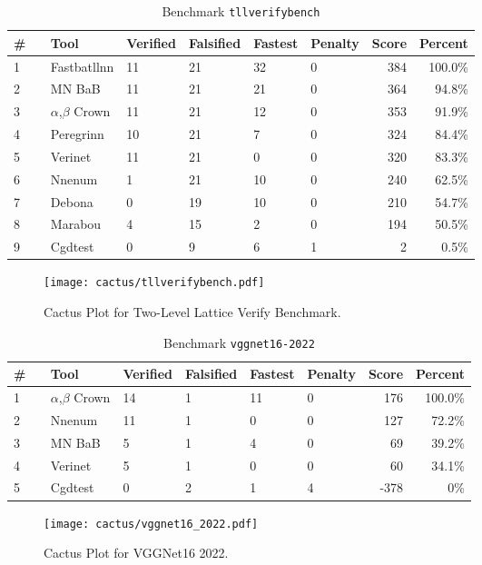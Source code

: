 
\begin{table}[h]
\begin{center}
\caption{Benchmark \texttt{tllverifybench}} \label{tab:cat_{cat}}
{\setlength{\tabcolsep}{2pt}
\begin{tabular}[h]{@{}llllllrr@{}}
\toprule
\textbf{\# ~} & \textbf{Tool} & \textbf{Verified} & \textbf{Falsified} & \textbf{Fastest} & \textbf{Penalty} & \textbf{Score} & \textbf{Percent}\\
\midrule
1 & Fastbatllnn & 11 & 21 & 32 & 0 & 384 & 100.0\% \\
2 & MN BaB & 11 & 21 & 21 & 0 & 364 & 94.8\% \\
3 & $\alpha$,$\beta$ Crown & 11 & 21 & 12 & 0 & 353 & 91.9\% \\
4 & Peregrinn & 10 & 21 & 7 & 0 & 324 & 84.4\% \\
5 & Verinet & 11 & 21 & 0 & 0 & 320 & 83.3\% \\
6 & Nnenum & 1 & 21 & 10 & 0 & 240 & 62.5\% \\
7 & Debona & 0 & 19 & 10 & 0 & 210 & 54.7\% \\
8 & Marabou & 4 & 15 & 2 & 0 & 194 & 50.5\% \\
9 & Cgdtest & 0 & 9 & 6 & 1 & 2 & 0.5\% \\
\bottomrule
\end{tabular}
}
\end{center}
\end{table}



\begin{figure}[h]
\centerline{\texttt{[image: cactus/tllverifybench.pdf]}}
\caption{Cactus Plot for Two-Level Lattice Verify Benchmark.}
\label{fig:quantPic}
\end{figure}



\begin{table}[h]
\begin{center}
\caption{Benchmark \texttt{vggnet16-2022}} \label{tab:cat_{cat}}
{\setlength{\tabcolsep}{2pt}
\begin{tabular}[h]{@{}llllllrr@{}}
\toprule
\textbf{\# ~} & \textbf{Tool} & \textbf{Verified} & \textbf{Falsified} & \textbf{Fastest} & \textbf{Penalty} & \textbf{Score} & \textbf{Percent}\\
\midrule
1 & $\alpha$,$\beta$ Crown & 14 & 1 & 11 & 0 & 176 & 100.0\% \\
2 & Nnenum & 11 & 1 & 0 & 0 & 127 & 72.2\% \\
3 & MN BaB & 5 & 1 & 4 & 0 & 69 & 39.2\% \\
4 & Verinet & 5 & 1 & 0 & 0 & 60 & 34.1\% \\
5 & Cgdtest & 0 & 2 & 1 & 4 & -378 & 0\% \\
\bottomrule
\end{tabular}
}
\end{center}
\end{table}



\begin{figure}[h]
\centerline{\texttt{[image: cactus/vggnet16\_2022.pdf]}}
\caption{Cactus Plot for VGGNet16 2022.}
\label{fig:quantPic}
\end{figure}

